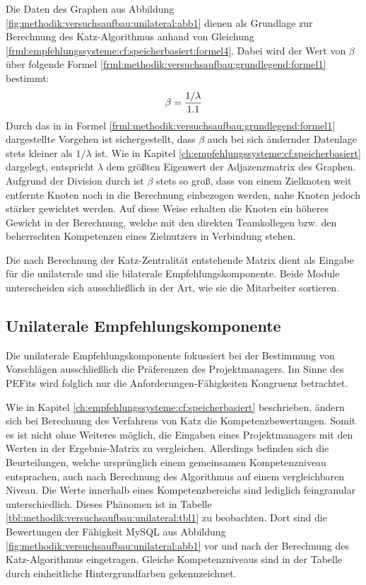 Die Daten des Graphen aus Abbildung \ref{fig:methodik:versuchsaufbau:unilateral:abb1} dienen als Grundlage zur Berechnung des Katz-Algorithmus anhand von Gleichung \ref{frml:empfehlungssysteme:cf:speicherbasiert:formel4}. Dabei wird der Wert von $\beta$ über folgende Formel \ref{frml:methodik:versuchsaufbau:grundlegend:formel1} bestimmt: 
\begin{equation}
	\beta = \frac{1/\lambda}{1.1}
	\label{frml:methodik:versuchsaufbau:grundlegend:formel1}
\end{equation}
Durch das in in Formel \ref{frml:methodik:versuchsaufbau:grundlegend:formel1} dargestellte Vorgehen ist sichergestellt, dass $\beta$ auch bei sich ändernder Datenlage stets kleiner als $1/\lambda$ ist. Wie in Kapitel \ref{ch:empfehlungssysteme:cf:speicherbasiert} dargelegt, entspricht $\lambda$ dem größten Eigenwert der Adjazenzmatrix des Graphen. Aufgrund der Division durch \nenner ist $\beta$ stets so groß, dass von einem Zielknoten weit entfernte Knoten noch in die Berechnung einbezogen werden, nahe Knoten jedoch stärker gewichtet werden. Auf diese Weise erhalten die Knoten ein höheres Gewicht in der Berechnung, welche mit den direkten Teamkollegen bzw. den beherrschten Kompetenzen eines Zielnutzers in Verbindung stehen.

Die nach Berechnung der Katz-Zentralität entstehende Matrix dient als Eingabe für die unilaterale und die bilaterale Empfehlungskomponente. Beide Module unterscheiden sich ausschließlich in der Art, wie sie die Mitarbeiter sortieren.

\subsection{Unilaterale Empfehlungskomponente}
\label{ch:methodik:versuchsaufbau:unilateral}
Die unilaterale Empfehlungskomponente fokussiert bei der Bestimmung von Vorschlägen ausschließlich die Präferenzen des Projektmanagers. Im Sinne des \acp{PEFit} wird folglich nur die Anforderungen-Fähigkeiten Kongruenz betrachtet.

Wie in Kapitel \ref{ch:empfehlungssysteme:cf:speicherbasiert} beschrieben, ändern sich bei Berechnung des Verfahrens von Katz die Kompetenzbewertungen. Somit es ist nicht ohne Weiteres möglich, die Eingaben eines Projektmanagers mit den Werten in der Ergebnis-Matrix zu vergleichen. Allerdings befinden sich die Beurteilungen, welche ursprünglich einem gemeinsamen Kompetenzniveau entsprachen, auch nach Berechnung des Algorithmus auf einem vergleichbaren Niveau. Die Werte innerhalb eines Kompetenzbereichs sind lediglich feingranular unterschiedlich. Dieses Phänomen ist in Tabelle \ref{tbl:methodik:versuchsaufbau:unilateral:tbl1} zu beobachten. Dort sind die Bewertungen der Fähigkeit MySQL aus Abbildung \ref{fig:methodik:versuchsaufbau:unilateral:abb1} vor und nach der Berechnung des Katz-Algorithmus eingetragen. Gleiche Kompetenzniveaus sind in der Tabelle durch einheitliche Hintergrundfarben gekennzeichnet.

